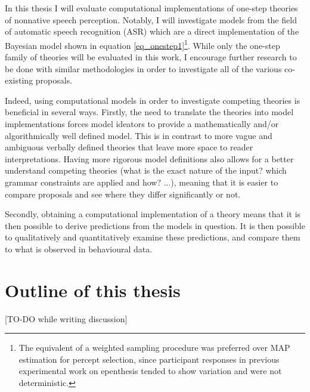 In this thesis I will evaluate computational implementations of one-step theories of nonnative speech perception. Notably, I will investigate models from the field of automatic speech recognition (ASR) which are a direct implementation of the Bayesian model shown in equation \ref{eq_onestep1}\footnote{The equivalent of a weighted sampling procedure was preferred over MAP estimation for percept selection, since participant responses in previous experimental work on epenthesis tended to show variation and were not deterministic.}. 
While only the one-step family of theories will be evaluated in this work, I encourage further research to be done with similar methodologies in order to investigate all of the various co-existing proposals.

Indeed, using computational models in order to investigate competing theories is beneficial in several ways. Firstly, the need to translate the theories into model implementations forces model ideators to provide a mathematically and/or algorithmically well defined model. This is in contrast to more vague and ambiguous verbally defined theories that leave more space to reader interpretations. Having more rigorous model definitions also allows for a better understand competing theories (what is the exact nature of the input? which grammar constraints are applied and how? ...), meaning that it is easier to compare proposals and see where they differ significantly or not. 

Secondly, obtaining a computational implementation of a theory means that it is then possible to derive predictions from the models in question. It is then possible to qualitatively and quantitatively examine these predictions, and compare them to what is observed in behavioural data.

\section{Outline of this thesis}

{\color{red}[TO-DO while writing discussion]}



